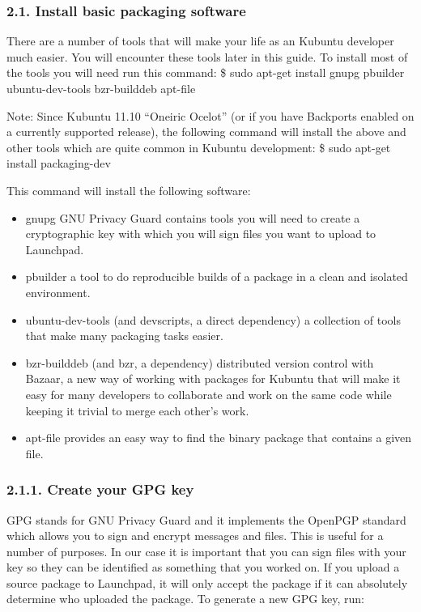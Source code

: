 \documentclass[letterpaper,10pt,english]{sphinxmanual}
\begin{document}
\subsubsection{2.1. Install basic packaging software}
\label{\detokenize{docs/packaging_guide/getting_started:install-basic-packaging-software}}
There are a number of tools that will make your life as an Kubuntu developer much easier. You will encounter these tools later in this guide. To install most of the tools you will need run this command:
\$ sudo apt-get install gnupg pbuilder ubuntu-dev-tools bzr-builddeb apt-file

Note: Since Kubuntu 11.10 “Oneiric Ocelot” (or if you have Backports enabled on a currently supported release), the following command will install the above and other tools which are quite common in Kubuntu development:
\$ sudo apt-get install packaging-dev

This command will install the following software:
\begin{itemize}
\item {} 
gnupg \textendash{} GNU Privacy Guard contains tools you will need to create a cryptographic key with which you will sign files you want to upload to Launchpad.

\item {} 
pbuilder \textendash{} a tool to do reproducible builds of a package in a clean and isolated environment.

\item {} 
ubuntu-dev-tools (and devscripts, a direct dependency) \textendash{} a collection of tools that make many packaging tasks easier.

\item {} 
bzr-builddeb (and bzr, a dependency) \textendash{} distributed version control with Bazaar, a new way of working with packages for Kubuntu that will make it easy for many developers to collaborate and work on the same code while keeping it trivial to merge each other’s work.

\item {} 
apt-file provides an easy way to find the binary package that contains a given file.

\end{itemize}


\subsubsection{2.1.1. Create your GPG key}
\label{\detokenize{docs/packaging_guide/getting_started:create-your-gpg-key}}
GPG stands for GNU Privacy Guard and it implements the OpenPGP standard which allows you to sign and encrypt messages and files. This is useful for a number of purposes. In our case it is important that you can sign files with your key so they can be identified as something that you worked on. If you upload a source package to Launchpad, it will only accept the package if it can absolutely determine who uploaded the package.
To generate a new GPG key, run:
\end{document}
